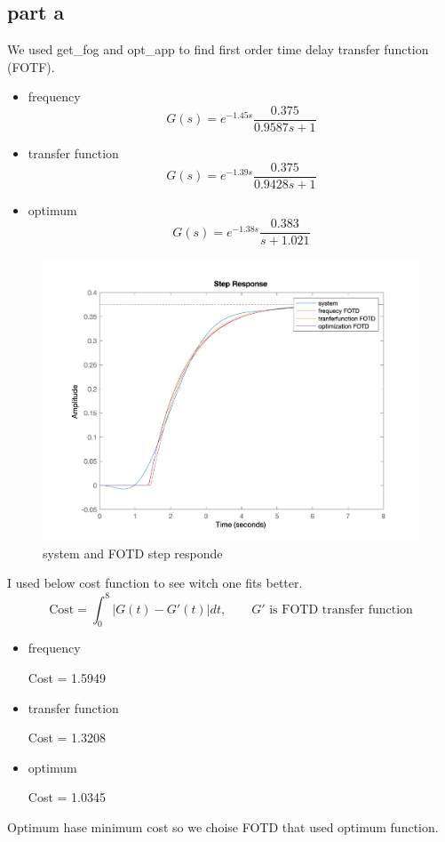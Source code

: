 \subsection{part a}

We used get\_fog and opt\_app to find first order time delay transfer function (FOTF).
\begin{itemize}
    \item frequency
    $$
    G(s) =  e^{-1.45s} \dfrac{0.375}{0.9587s + 1}
    $$
    \item transfer function
    $$
    G(s) =  e^{-1.39s} \dfrac{0.375}{0.9428s + 1}
    $$
    \item optimum
    $$
    G(s) =  e^{-1.38s} \dfrac{0.383}{s + 1.021}
    $$
\end{itemize}
\begin{figure}[H]
    \caption{system and FOTD step responde}
    \centering
    \includegraphics[width=12cm]{../Figure/Q1/a/FOTD.png}
\end{figure}
I used below cost function to see witch one fits better.
$$
\text{Cost} = \int_{0}^{8} \vert G(t) - G'(t)\vert dt,\qquad \text{$G'$ is FOTD transfer function}
$$
\begin{itemize}
    \item frequency
    
    Cost = 1.5949
    \item transfer function
    
    Cost = 1.3208
    \item optimum
    
    Cost = 1.0345
\end{itemize}
Optimum hase minimum cost so we choise FOTD that used optimum function.
